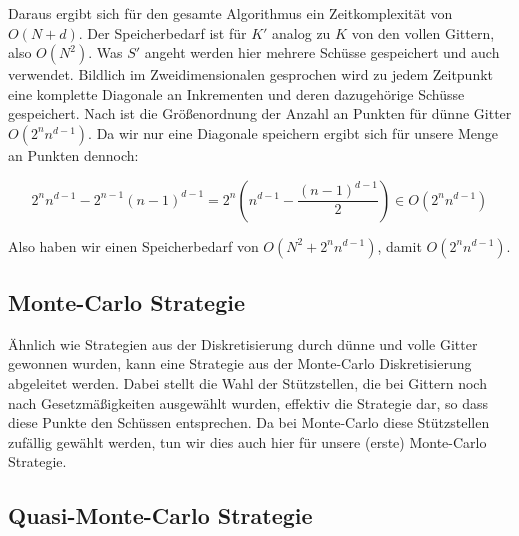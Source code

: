 \documentclass[a4paper,12pt]{llncs}
\numberwithin{equation}{section}
\begin{document}
Daraus ergibt sich für den gesamte Algorithmus ein Zeitkomplexität von $O(N+d)$. Der Speicherbedarf ist für $K'$ analog zu $K$ von den vollen Gittern, also $O(N^2)$. Was $S'$ angeht werden hier mehrere Schüsse gespeichert und auch verwendet. Bildlich im Zweidimensionalen gesprochen wird zu jedem Zeitpunkt eine komplette Diagonale an Inkrementen und deren dazugehörige Schüsse gespeichert. Nach \cite{GG08} ist die Größenordnung der Anzahl an Punkten für dünne Gitter $O(2^nn^{d-1})$. Da wir nur eine Diagonale speichern ergibt sich für unsere Menge an Punkten dennoch:

\begin{equation}
2^nn^{d-1}-2^{n-1}(n-1)^{d-1}=2^n\left(n^{d-1}-\frac{(n-1)^{d-1}}{2}\right)\in O(2^nn^{d-1})
\end{equation}

Also haben wir einen Speicherbedarf von $O(N^2+2^nn^{d-1})$, damit $O(2^nn^{d-1})$.


\subsection{Monte-Carlo Strategie}

Ähnlich wie Strategien aus der Diskretisierung durch dünne und volle Gitter gewonnen wurden, kann eine Strategie aus der Monte-Carlo Diskretisierung abgeleitet werden. Dabei stellt die Wahl der Stützstellen, die bei Gittern noch nach Gesetzmäßigkeiten ausgewählt wurden, effektiv die Strategie dar, so dass diese Punkte den Schüssen entsprechen. Da bei Monte-Carlo diese Stützstellen zufällig gewählt werden, tun wir dies auch hier für unsere (erste) Monte-Carlo Strategie. 

\subsection{Quasi-Monte-Carlo Strategie}


\newpage

% 
\end{document}
